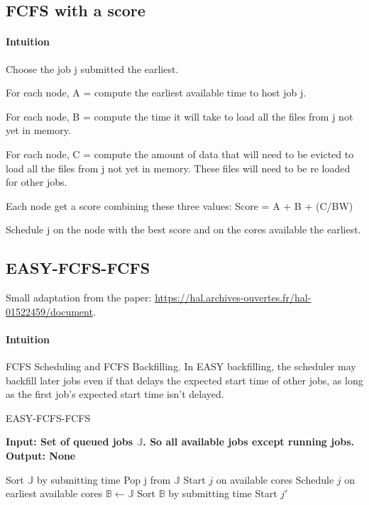 \documentclass[a4paper]{article}
\newcommand{\jobset}{\ensuremath{\mathbb{J}}\xspace}
\begin{document}
\subsection{FCFS with a score}
\paragraph{Intuition}
Choose the job j submitted the earliest.

For each node, A = compute the earliest available time to host job j.

For each node, B = compute the time it will take to load all the files from j not yet in memory.

For each node, C = compute the amount of data that will need to be evicted to load all the files from j not yet in memory. These files will need to be re loaded for other jobs.

Each node get a score combining these three values: Score = A + B + (C/BW)

Schedule j on the node with the best score and on the cores available the earliest.

\subsection{EASY-FCFS-FCFS}
Small adaptation from the paper: \url{https://hal.archives-ouvertes.fr/hal-01522459/document}.
\paragraph{Intuition}
FCFS Scheduling and FCFS Backfilling.
In EASY backfilling, the scheduler may backfill later jobs even if that delays the expected start time of other jobs, as long as the first job's expected start time isn't delayed. 
\begin{algorithm}[H]
\caption{EASY-FCFS-FCFS}
\hspace*{\algorithmicindent} \textbf{Input: Set of queued jobs $\jobset$. So all available jobs except running jobs.} \\
\hspace*{\algorithmicindent} \textbf{Output: None}
\begin{algorithmic}[1]
\State Sort $\jobset$ by submitting time
\State Pop j from $\jobset$
	\State Start $j$ on available cores
\Else
	\State Schedule $j$ on earliest available cores 
	\State $\mathbb{B} \gets \jobset$
	\State Sort $\mathbb{B}$ by submitting time 
		 
			\State Start $j'$
		\EndIf
	\EndFor
\EndIf		
\end{algorithmic}
\end{algorithm}
\end{document}
